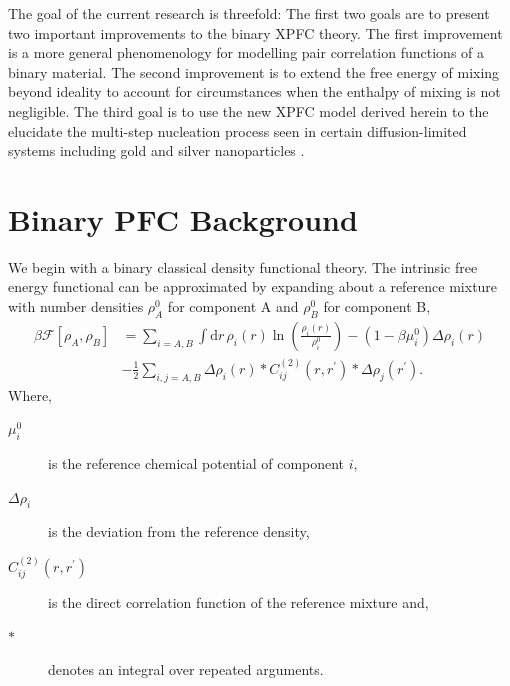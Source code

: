 \documentclass[showkeys, prb, reprint]{revtex4-1}
\newcommand{\F}{\mathcal{F}}    %
\renewcommand{\l}{\left}        %
\renewcommand{\r}{\right}       %
\newcommand{\f}{\frac}          %
\newcommand{\A}{\rho_A}         %
\newcommand{\B}{\rho_B}         %
\begin{document}

The goal of the current research is threefold: The first two goals are to
present two important improvements to the binary XPFC theory. The first
improvement is a more general phenomenology for modelling pair correlation
functions of a binary material. The second improvement is to extend the free
energy of mixing beyond ideality to account for circumstances when the enthalpy of
mixing is not negligible. The third goal is to use the new XPFC model derived
herein to the elucidate the multi-step nucleation process seen in certain
diffusion-limited systems including gold and silver nanoparticles \cite{LOH17}.

\section{Binary PFC Background} %

We begin with a binary classical density functional theory. The intrinsic free
energy functional can be approximated by expanding about a reference mixture
with number densities $\rho_A^0$ for component A and $\rho_B^0$ for component
B,
%
\begin{align}
    \label{binary_cdft_free_energy}
    \beta\F[\A, \B] &= \sum_{i=A, B} \int \mathrm{d}r 
        \,\rho_i(r) \ln\l(\f{\rho_i(r)}{\rho_i^0}\r) 
        - (1 - \beta\mu_i^0)\Delta\rho_i(r)\\
    &- \f{1}{2} \sum_{i,j=A, B} \Delta\rho_i(r) \ast C^{(2)}_{ij}(r, r^\prime) 
        \ast \Delta\rho_j(r^\prime). \nonumber
\end{align}
%
Where,
\begin{description}
    \item[$\mu_i^0$] is the reference chemical potential of component $i$,
    \item[$\Delta\rho_i$] is the deviation from the reference density,
    \item[$C^{(2)}_{ij}(r, r^\prime)$] is the direct correlation function
        of the reference mixture and,
    \item[$\ast$] denotes an integral over repeated arguments.
\end{description}
\end{document}
